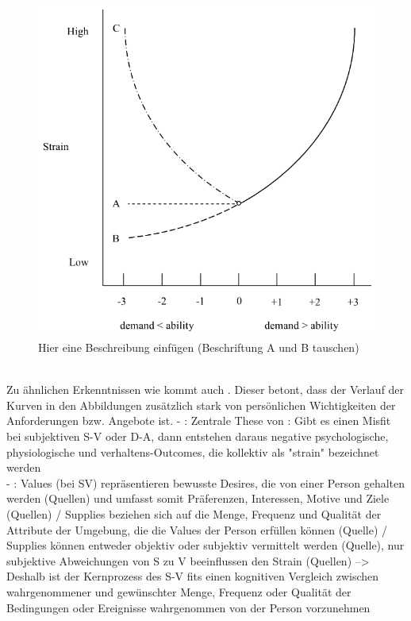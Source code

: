 \begin{figure}[h]
	\centering
	\includegraphics[width=1\textwidth]{gfx/ueberschuss_demand_abilities.png}
	\caption{Hier eine Beschreibung einfügen (Beschriftung A und B tauschen) \cite[S. 23]{edwards:2008}}
	\label{fig:personEnvironmentFit:auswirkungenErhoehterAngebote:abb2}
\end{figure}
\\
Zu ähnlichen Erkenntnissen wie \textcite{caplan:1987, copingAndAdaption:1974, harrison:1978, mechanismsOfJobStressAndStrain:1982} kommt auch \textcite{locke:1969}. Dieser betont, dass der Verlauf der Kurven in den Abbildungen zusätzlich stark von persönlichen Wichtigkeiten der Anforderungen bzw. Angebote ist. 
\newpage
- \cite[S. 2]{edwards:1990}: Zentrale These von \textcite{mechanismsOfJobStressAndStrain:1982}: Gibt es einen Misfit bei subjektiven S-V oder D-A, dann entstehen daraus negative psychologische, physiologische und verhaltens-Outcomes, die kollektiv als "strain" bezeichnet werden \\
- \cite[S. 3]{edwards:1996}: Values (bei SV) repräsentieren bewusste Desires, die von einer Person gehalten werden (Quellen) und umfasst somit Präferenzen, Interessen, Motive und Ziele (Quellen) / Supplies beziehen sich auf die Menge, Frequenz und Qualität der Attribute der Umgebung, die die Values der Person erfüllen können (Quelle) / Supplies können entweder objektiv oder subjektiv vermittelt werden (Quelle), nur subjektive Abweichungen von S zu V beeinflussen den Strain (Quellen) --> Deshalb ist der Kernprozess des S-V fits einen kognitiven Vergleich zwischen wahrgenommener und gewünschter Menge, Frequenz oder Qualität der Bedingungen oder Ereignisse wahrgenommen von der Person vorzunehmen \\

